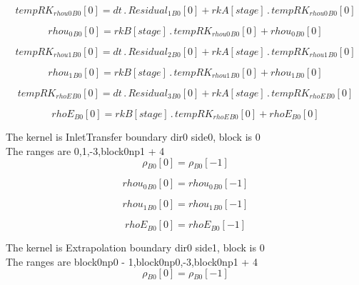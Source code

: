 \documentclass{article}
\begin{document}
\begin{dmath}{tempRK_{rhou0}{_{B0}}}[{0}] = dt \,.\, {Residual_{1}{_{B0}}}[{0}] + {rkA}[{stage}] \,.\, {tempRK_{rhou0}{_{B0}}}[{0}]\end{dmath}

\begin{dmath}{rhou_{0}{_{B0}}}[{0}] = {rkB}[{stage}] \,.\, {tempRK_{rhou0}{_{B0}}}[{0}] + {rhou_{0}{_{B0}}}[{0}]\end{dmath}

\begin{dmath}{tempRK_{rhou1}{_{B0}}}[{0}] = dt \,.\, {Residual_{2}{_{B0}}}[{0}] + {rkA}[{stage}] \,.\, {tempRK_{rhou1}{_{B0}}}[{0}]\end{dmath}

\begin{dmath}{rhou_{1}{_{B0}}}[{0}] = {rkB}[{stage}] \,.\, {tempRK_{rhou1}{_{B0}}}[{0}] + {rhou_{1}{_{B0}}}[{0}]\end{dmath}

\begin{dmath}{tempRK_{rhoE}{_{B0}}}[{0}] = dt \,.\, {Residual_{3}{_{B0}}}[{0}] + {rkA}[{stage}] \,.\, {tempRK_{rhoE}{_{B0}}}[{0}]\end{dmath}

\begin{dmath}{rhoE{_{B0}}}[{0}] = {rkB}[{stage}] \,.\, {tempRK_{rhoE}{_{B0}}}[{0}] + {rhoE{_{B0}}}[{0}]\end{dmath}

\noindent The kernel is InletTransfer boundary dir0 side0, block is 0\\\noindent The ranges are 0,1,-3,block0np1 + 4\\\begin{dmath}{\rho{_{B0}}}[{0}] = {\rho{_{B0}}}[{-1}]\end{dmath}

\begin{dmath}{rhou_{0}{_{B0}}}[{0}] = {rhou_{0}{_{B0}}}[{-1}]\end{dmath}

\begin{dmath}{rhou_{1}{_{B0}}}[{0}] = {rhou_{1}{_{B0}}}[{-1}]\end{dmath}

\begin{dmath}{rhoE{_{B0}}}[{0}] = {rhoE{_{B0}}}[{-1}]\end{dmath}

\noindent The kernel is Extrapolation boundary dir0 side1, block is 0\\\noindent The ranges are block0np0 - 1,block0np0,-3,block0np1 + 4\\\begin{dmath}{\rho{_{B0}}}[{0}] = {\rho{_{B0}}}[{-1}]\end{dmath}
\end{document}
